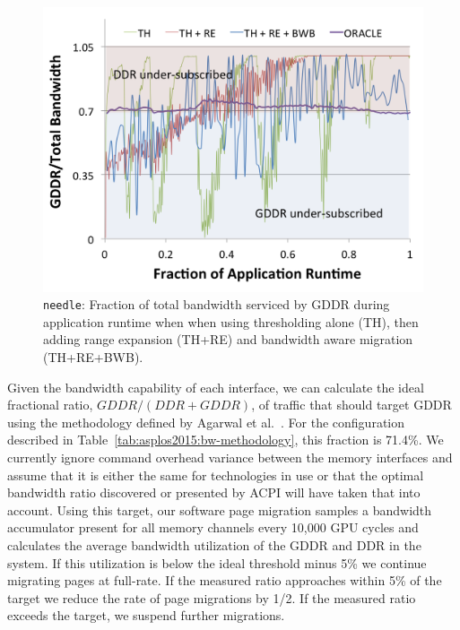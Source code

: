\begin{figure}[t]
\centering
    \includegraphics[width=0.9\columnwidth]{hpca2015/figures/needle-bw-ratio.png}
    \caption{{\tt needle}: Fraction of total bandwidth serviced by GDDR during application
runtime when when using thresholding alone (TH), then adding range expansion
(TH+RE) and bandwidth aware migration (TH+RE+BWB).}
    \label{fig:migrationlimiting-needle}
\end{figure}

Given the bandwidth capability of each interface, we can calculate the ideal
fractional ratio, $GDDR / (DDR + GDDR)$, of traffic that should target GDDR
using the methodology defined by Agarwal et al.~\cite{ref:agarwal:asplos2015}.  For the
configuration described in Table~\ref{tab:asplos2015:bw-methodology}, this fraction is
71.4\%.  We currently ignore command overhead variance between the memory
interfaces and assume that it is either the same for technologies in use or that
the optimal bandwidth ratio discovered or presented by ACPI will have taken that
into account.  Using this target, our software page migration samples a
bandwidth accumulator present for all memory channels every 10,000 GPU cycles
and calculates the average bandwidth utilization of the GDDR and DDR in the
system.  If this utilization is below the ideal threshold minus 5\% we continue
migrating pages at full-rate.  If the measured ratio approaches within 5\% of
the target we reduce the rate of page migrations by 1/2.  If the measured ratio
exceeds the target, we suspend further migrations.

